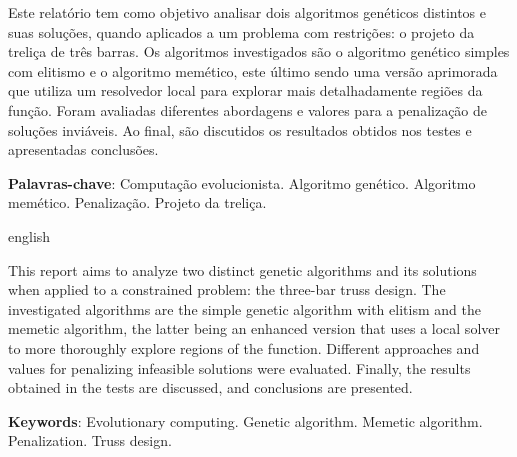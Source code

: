 \begin{resumoumacoluna}
    Este relatório tem como objetivo analisar dois algoritmos genéticos distintos e suas soluções, quando aplicados a um problema com restrições: o projeto da treliça de três barras. Os algoritmos investigados são o algoritmo genético simples com elitismo e o algoritmo memético, este último sendo uma versão aprimorada que utiliza um resolvedor local para explorar mais detalhadamente regiões da função.
    Foram avaliadas diferentes abordagens e valores para a penalização de soluções inviáveis. Ao final, são discutidos os resultados obtidos nos testes e apresentadas conclusões.

    \noindent
    \textbf{Palavras-chave}: Computação evolucionista. Algoritmo genético. Algoritmo memético. Penalização. Projeto da treliça.
\end{resumoumacoluna}

\renewcommand{\resumoname}{Abstract}
\begin{resumoumacoluna}
    \begin{otherlanguage*}{english}

        This report aims to analyze two distinct genetic algorithms and its solutions when applied to a constrained problem: the three-bar truss design. The investigated algorithms are the simple genetic algorithm with elitism and the memetic algorithm, the latter being an enhanced version that uses a local solver to more thoroughly explore regions of the function.
        Different approaches and values for penalizing infeasible solutions were evaluated. Finally, the results obtained in the tests are discussed, and conclusions are presented.

        \vspace{\onelineskip}

        \noindent
        \textbf{Keywords}: Evolutionary computing. Genetic algorithm. Memetic algorithm. Penalization. Truss design.
    \end{otherlanguage*}
\end{resumoumacoluna}
